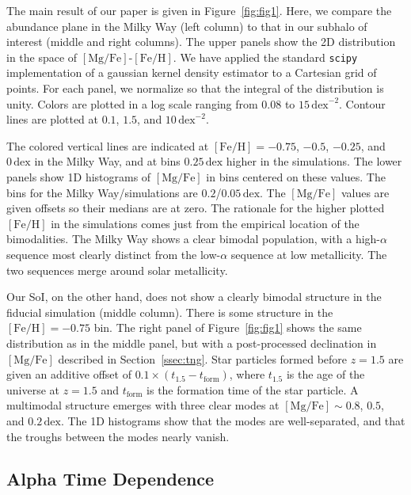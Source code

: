 \documentclass[linenumbers, twocolumn]{aastex631}
\newcommand{\FeH}{\ensuremath{[\textrm{Fe}/\textrm{H}]}}
\newcommand{\MgFe}{\ensuremath{[\textrm{Mg}/\textrm{Fe}]}}
\newcommand{\dex}{\ensuremath{\textrm{dex}}}
\begin{document}
The main result of our paper is given in Figure~\ref{fig:fig1}. Here, we compare the abundance plane in the Milky Way (left column) to that in our subhalo of interest (middle and right columns). The upper panels show the 2D distribution in the space of \MgFe{}-\FeH{}. We have applied the standard \texttt{scipy} implementation of a gaussian kernel density estimator to a Cartesian grid of points. For each panel, we normalize so that the integral of the distribution is unity. Colors are plotted in a log scale ranging from $0.08$ to $15\,\dex^{-2}$. Contour lines are plotted at $0.1$, $1.5$, and $10\,\dex^{-2}$.

The colored vertical lines are indicated at $\FeH=-0.75$, $-0.5$, $-0.25$, and $0\,\dex$ in the Milky Way, and at bins $0.25\,\dex$ higher in the simulations. The lower panels show 1D histograms of \MgFe{} in bins centered on these values. The bins for the Milky Way/simulations are $0.2$/$0.05\,\dex$. The \MgFe{} values are given offsets so their medians are at zero. The rationale for the higher plotted \FeH{} in the simulations comes just from the empirical location of the bimodalities. The Milky Way shows a clear bimodal population, with a high-$\alpha$ sequence most clearly distinct from the low-$\alpha$ sequence at low metallicity. The two sequences merge around solar metallicity.

Our SoI, on the other hand, does not show a clearly bimodal structure in the fiducial simulation (middle column). There is some structure in the $\FeH=-0.75$ bin. The right panel of Figure~\ref{fig:fig1} shows the same distribution as in the middle panel, but with a post-processed declination in \MgFe{} described in Section~\ref{ssec:tng}. Star particles formed before $z=1.5$ are given an additive offset of $0.1\times\left(t_{1.5}-t_{\textrm{form}}\right)$, where $t_{1.5}$ is the age of the universe at $z=1.5$ and $t_{\textrm{form}}$ is the formation time of the star particle. A multimodal structure emerges with three clear modes at $\MgFe\sim0.8$, $0.5$, and $0.2\,\dex$. The 1D histograms show that the modes are well-separated, and that the troughs between the modes nearly vanish.

\subsection{Alpha Time Dependence}\label{ssec:alpha_time}
\end{document}
